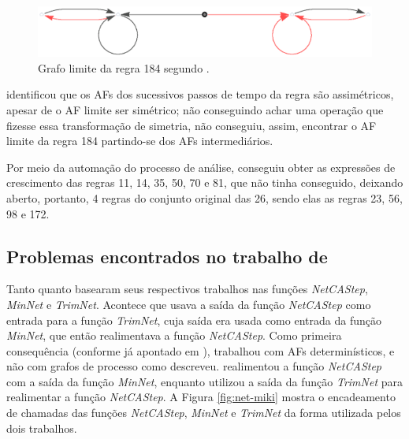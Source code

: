 \documentclass[12pt,a4paper]{article}
\begin{document}
\begin{figure}[htp]
\begin{center}
\includegraphics[scale=0.8]{img/limit184.eps}
\caption[Grafo limite da regra 184]
{Grafo limite da regra 184 segundo .}
\label{fig:limit184}
\end{center}
\end{figure}

 identificou que os AFs dos sucessivos passos de
tempo da regra são assimétricos, apesar de o AF limite ser simétrico; não
conseguindo achar uma operação que fizesse essa transformação de simetria,
não conseguiu, assim, encontrar o AF limite da regra 184
partindo-se dos AFs intermediários.

Por meio da automação do processo de análise,  conseguiu
obter as expressões de crescimento das regras 11, 14, 35, 50, 70 e 81, que
 não tinha conseguido, deixando aberto, portanto, 4
regras do conjunto original das 26, sendo elas as regras 23, 56, 98 e 172.

\subsection{Problemas encontrados no trabalho de
}\label{sec:problem}

Tanto  quanto  basearam seus
respectivos trabalhos nas funções \emph{NetCAStep}, \emph{MinNet} e \emph{TrimNet}.
Acontece que  usava a saída da função \emph{NetCAStep} como entrada
para a função \emph{TrimNet}, cuja saída era usada como entrada da função
\emph{MinNet}, que então realimentava a função \emph{NetCAStep}. Como primeira
consequência (conforme já apontado em ),
 trabalhou com AFs determinísticos, e não com
grafos de processo como descreveu.  realimentou
a função \emph{NetCAStep} com a saída da função \emph{MinNet}, enquanto
 utilizou a saída da função \emph{TrimNet} para realimentar
a função \emph{NetCAStep}. A Figura \ref{fig:net-miki} mostra o encadeamento de
chamadas das funções \emph{NetCAStep}, \emph{MinNet} e \emph{TrimNet} da forma
utilizada pelos dois trabalhos.
\end{document}
